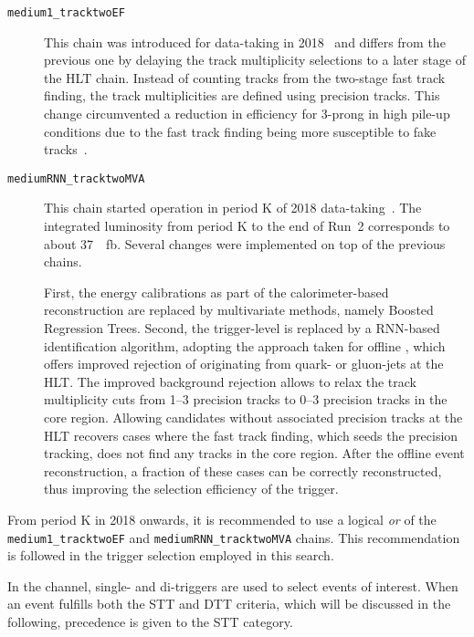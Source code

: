 \begin{description}
\item[\texttt{medium1\_tracktwoEF}]
  This chain was introduced for data-taking in
  2018~\cite{ATL-DAQ-PUB-2019-001} and differs from the previous one
  by delaying the track multiplicity selections to a later stage of
  the HLT chain. Instead of counting tracks from the two-stage fast
  track finding, the track multiplicities are defined using precision
  tracks. This change circumvented a reduction in efficiency for
  3-prong \tauhadvis in high pile-up conditions due to the fast track
  finding being more susceptible to fake
  tracks~\cite{ATL-DAQ-PUB-2019-001}.

\item[\texttt{mediumRNN\_tracktwoMVA}] This chain started operation in
  period K of 2018 data-taking~\cite{ATL-DAQ-PUB-2019-001}. The
  integrated luminosity from period K to the end of Run~2 corresponds
  to about \SI{37}{\per\femto\barn}. Several changes were implemented
  on top of the previous chains.

  First, the \tauhadvis energy calibrations as part of the
  calorimeter-based \tauhadvis reconstruction are replaced by
  multivariate methods, namely Boosted Regression Trees. Second, the
  trigger-level \tauid is replaced by a RNN-based identification
  algorithm, adopting the approach taken for offline \tauid, which
  offers improved rejection of \tauhadvis originating from quark- or
  gluon-jets at the HLT. The improved background rejection allows to
  relax the track multiplicity cuts from 1--3 precision tracks to 0--3
  precision tracks in the core region. Allowing \tauhadvis candidates
  without associated precision tracks at the HLT recovers cases where
  the fast track finding, which seeds the precision tracking, does not
  find any tracks in the core region. After the offline event
  reconstruction, a fraction of these cases can be correctly
  reconstructed, thus improving the selection efficiency of the
  trigger.
\end{description}
From period K in 2018 onwards, it is recommended to use a logical
\emph{or} of the \texttt{medium1\_tracktwoEF} and
\texttt{mediumRNN\_tracktwoMVA} chains. This recommendation is
followed in the trigger selection employed in this search.

In the \hadhad channel, single- and di-\tauhadvis triggers are used to
select events of interest. When an event fulfills both the STT and DTT
criteria, which will be discussed in the following, precedence is
given to the STT category.


